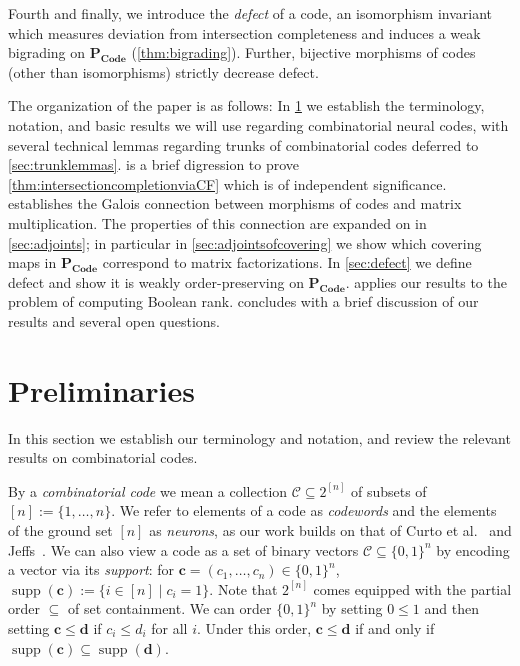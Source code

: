 \documentclass[11pt,letterpaper, reqno]{amsart}
\theoremstyle{definition}
\DeclareMathOperator{\supp}{supp}
\def\bc{\mathbf{c}}
\def\bd{\mathbf{d}}
\def\cC{\mathcal{C}}
\def\pcode{\mathbf{P_{Code}}}
\begin{document}
Fourth and finally, we introduce the \emph{defect} of a code, an isomorphism invariant which measures deviation from intersection completeness and induces a weak bigrading on $\pcode$ (\cref{thm:bigrading}).
Further, bijective morphisms of codes (other than isomorphisms) strictly decrease defect.

The organization of the paper is as follows:
In \cref{sec:preliminaries} we establish the terminology, notation, and basic results we will use regarding combinatorial neural codes, with several technical lemmas regarding trunks of combinatorial codes deferred to \cref{sec:trunklemmas}.
 is a brief digression to prove \cref{thm:intersectioncompletionviaCF} which is of independent significance.
 establishes the Galois connection between morphisms of codes and matrix multiplication. The properties of this connection are expanded on in \cref{sec:adjoints};
in particular in \cref{sec:adjointsofcovering} we show which covering maps in $\pcode$ correspond to matrix factorizations.
In \cref{sec:defect} we define defect and show it is weakly order-preserving on $\pcode$.
 applies our results to the problem of computing Boolean rank.  concludes with a brief discussion of our results and several open questions.

\section{Preliminaries}\label{sec:preliminaries}
    In this section we establish our terminology and notation, and review the relevant results on combinatorial codes.

    By a \emph{combinatorial code} we mean a collection $\cC \subseteq 2^{[n]}$ of subsets of $[n] := \{1,\dots,n\}$. We refer to elements of a code as \emph{codewords} and the elements of the ground set $[n]$ as \emph{neurons}, as our work builds on that of Curto et al.~\cite{neuralring13} and Jeffs~\cites{morphisms,jeffs2019sunflowers}.
    We can also view a code as a set of binary vectors $\cC \subseteq \{0,1\}^n$ by encoding a vector via its \emph{support}: for $\bc = (c_1,\dots,c_n) \in \{0,1\}^n$, $\supp(\bc) := \{i \in [n] \mid c_i = 1\}$.
    Note that $2^{[n]}$ comes equipped with the partial order $\subseteq$ of set containment. 
    We can order $\{0,1\}^n$ by setting $0 \leq 1$ and then setting $\bc \leq \bd$ if $c_i \leq d_i$ for all $i$. Under this order, $\bc \leq \bd$ if and only if $\supp(\bc) \subseteq \supp(\bd)$. 
\end{document}

